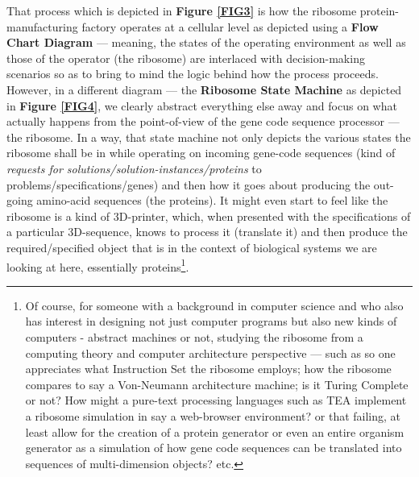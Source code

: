 \documentclass[a4paper, 18pt]{article} %
\begin{document}
That process which is depicted in \textbf{Figure \ref{FIG3}} is how the ribosome protein-manufacturing factory operates at a cellular level as depicted using a \textbf{Flow Chart Diagram} --- meaning, the states of the operating environment as well as those of the operator (the ribosome) are interlaced with decision-making scenarios so as to bring to mind the logic behind how the process proceeds. However, in a different diagram --- the \textbf{Ribosome State Machine} as depicted in \textbf{Figure \ref{FIG4}}, we clearly abstract everything else away and focus on what actually happens from the point-of-view of the gene code sequence processor --- the ribosome. In a way, that state machine not only depicts the various states the ribosome shall be in while operating on incoming gene-code sequences (kind of \textit{requests for solutions/solution-instances/proteins} to problems/specifications/genes) and then how it goes about producing the out-going amino-acid sequences (the proteins). It might even start to feel like the ribosome is a kind of 3D-printer, which, when presented with the specifications of a particular 3D-sequence, knows to process it (translate it) and then produce the required/specified object that is in the context of biological systems we are looking at here, essentially proteins\footnote{Of course, for someone with a background in computer science and who also has interest in designing not just computer programs but also new kinds of computers - abstract machines or not, studying the ribosome from a computing theory and computer architecture perspective --- such as so one appreciates what Instruction Set the ribosome employs; how the ribosome compares to say a Von-Neumann architecture machine; is it Turing Complete or not? How might a pure-text processing languages such as TEA\cite{lutalo2024software} implement a ribosome simulation in say a web-browser environment?\cite{lutalo_tea_web} or that failing, at least allow for the creation of a protein generator or even an entire organism generator as a simulation of how gene code sequences can be translated into sequences of multi-dimension objects?\cite{lutalo2025transformatic} etc.}.
\end{document}
